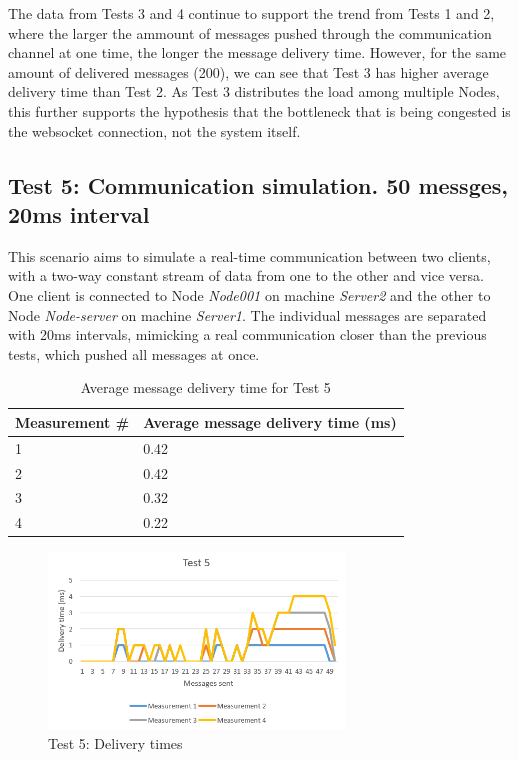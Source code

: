 The data from Tests 3 and 4 continue to support the trend from Tests 1 and 2, where the larger the ammount of messages pushed through the communication channel at one time, the longer the message delivery time. However, for the same amount of delivered messages (200), we can see that Test 3 has higher average delivery time than Test 2. As Test 3 distributes the load among multiple Nodes, this further supports the hypothesis that the bottleneck that is being congested is the websocket connection, not the system itself.

\clearpage

\subsection{Test 5: Communication simulation. 50 messges, 20ms interval}
This scenario aims to simulate a real-time communication between two clients, with a two-way constant stream of data from one to the other and vice versa. One client is connected to Node \textit{Node001} on machine \textit{Server2} and the other to Node \textit{Node-server} on machine \textit{Server1}. The individual messages are separated with 20ms intervals, mimicking a real communication closer than the previous tests, which pushed all messages at once.

\begin{table}[!ht]
\begin{center}
\begin{tabularx}{0.7\textwidth}{l|l}
\hline
\textbf{Measurement \#} & \textbf{Average message delivery time (ms)} \\
\hline
1 & 0.42\\
\hline
2 & 0.42\\
\hline
3 & 0.32\\
\hline
4 & 0.22\\
\hline
\end{tabularx}
\end{center}
\caption{Average message delivery time for Test 5}
\label{tab:test-perf5}
\end{table}

\begin{figure}[!ht]
	\centering
	\includegraphics[width=0.7\textwidth]{figures/05_testing/test-perf5}
    \caption{Test 5: Delivery times}
    \label{fig:test-perf5}
\end{figure}

